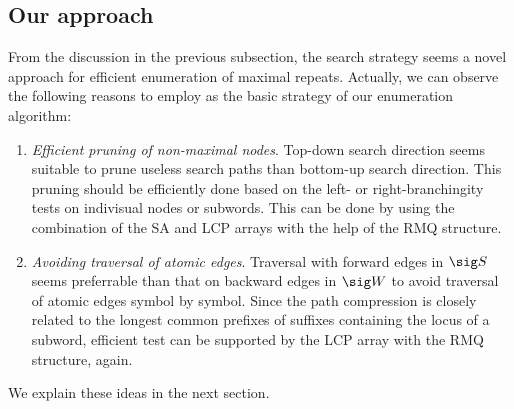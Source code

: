\subsection{Our approach}
From the discussion in the previous subsection, the search strategy {\tdfw} seems a novel approach for efficient enumeration of maximal repeats. Actually, we can observe the following reasons to employ {\tdfw} as the basic strategy of our enumeration algorithm:  
\begin{enumerate}
\item \textit{Efficient pruning of non-maximal nodes}. Top-down search direction seems suitable to prune useless search paths than bottom-up search direction. This pruning should be efficiently done based on the left- or right-branchingity tests on indivisual nodes or subwords. This can be done by using the combination of the SA and LCP arrays with the help of the RMQ structure. 

\item \textit{Avoiding traversal of atomic edges}. Traversal with forward edges in $\sig S$ seems preferrable than that on backward edges in $\sig W$ to avoid traversal of atomic edges symbol by symbol. Since the path compression is closely related to the longest common prefixes of suffixes containing the locus of a subword, efficient test can be supported by  the LCP array with the RMQ structure, again. 
\end{enumerate}

We explain these ideas in the next section. 

